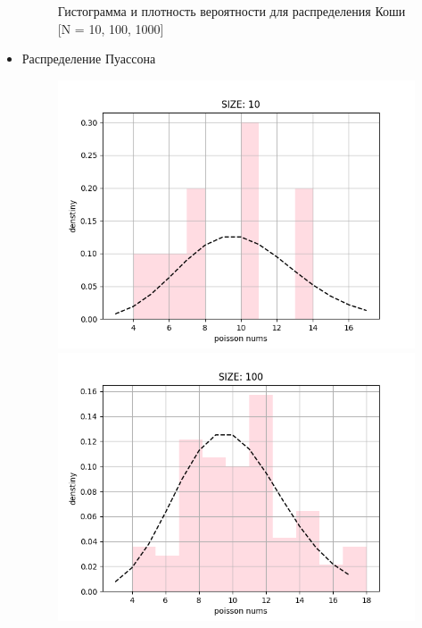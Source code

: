 \begin{itemize}
\begin{figure}[H]
\begin{center}
			\caption{Гистограмма и плотность вероятности для распределения Коши [N = 10, 100, 1000]}
		\end{center}
	\end{figure}
		
	\item{Распределение Пуассона}
	\begin{figure}[H]
		\begin{center}
			\includegraphics[scale=0.333]{resources/poisson10.png}
			\includegraphics[scale=0.333]{resources/poisson100.png}

\end{center}
\end{figure}
\end{itemize}
